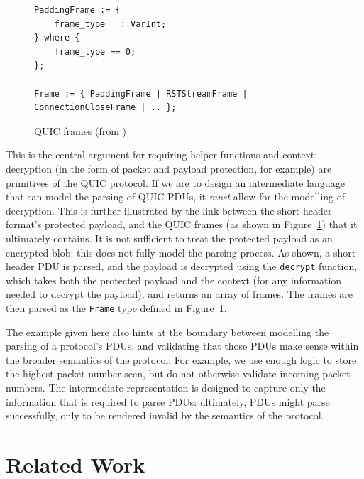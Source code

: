 \documentclass[10pt,sigconf]{acmart}
\begin{document}
\begin{figure}
	\vspace{3mm}
    \begin{BVerbatim}[fontsize=\scriptsize]
PaddingFrame := {
	frame_type   : VarInt;
} where {
	frame_type == 0;
};

Frame := { PaddingFrame | RSTStreamFrame | ConnectionCloseFrame | .. };
    \end{BVerbatim}
    \caption{QUIC frames (from \cite{draft-ietf-quic-transport-latest})}
    \label{fig:quic-frame-desc}
\end{figure}

This is the central argument for requiring helper functions and context: decryption (in
the form of packet and payload protection, for example) are primitives of the QUIC
protocol. If we are to design an intermediate language that can model the parsing of QUIC
PDUs, it \emph{must} allow for the modelling of decryption. This is further illustrated
by the link between the short header format's protected payload, and the QUIC frames (as
shown in Figure~\ref{fig:quic-frame-desc}) that it ultimately contains. It is not sufficient
to treat the protected payload as an encrypted blob: this does not fully model the parsing
process. As shown, a short header PDU is parsed, and the payload is decrypted using the
\texttt{decrypt} function, which takes both the protected payload and the context (for any
information needed to decrypt the payload), and returns an array of frames. The frames are
then parsed as the \texttt{Frame} type defined in Figure~\ref{fig:quic-frame-desc}.

The example given here also hints at the boundary between modelling the parsing of a 
protocol's PDUs, and validating that those PDUs make sense within the broader semantics 
of the protocol. For example, we use enough logic to store the highest packet number seen,
but do not otherwise validate incoming packet numbers. The intermediate representation is
designed to capture only the information that is required to parse PDUs: ultimately, PDUs
might parse successfully, only to be rendered invalid by the semantics of the protocol.

\section{Related Work}
\label{sec:related}
\end{document}

